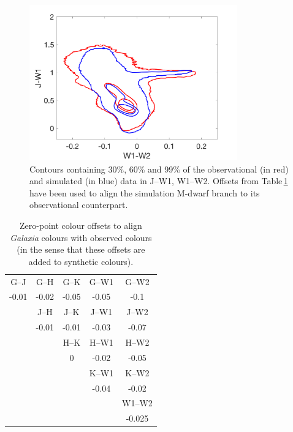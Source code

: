 \begin{figure}
	\centering
    \includegraphics[width=0.8\textwidth]{Landmarks.pdf}
    \caption{Contours containing 30\%, 60\% and 99\% of the observational (in red) and simulated (in blue) data in J--W1, W1--W2. Offsets from Table\,\ref{tabOffset} have been used to align the simulation M-dwarf branch to its observational counterpart.}
    \label{figLandmark}
\end{figure}

\begin{table}
	\begin{center}
	\begin{tabular}{c c c c c} 
 		\hline
 		 G--J & G--H & G--K & G--W1 & G--W2\\
 		-0.01 & -0.02 & -0.05  & -0.05  & -0.1\\
        \hline
            & J--H & J--K & J--W1 & J--W2\\
            & -0.01 & -0.01 & -0.03 & -0.07\\
            \cline{2-5}
            \cline{2-5}
            &    & H--K & H--W1 & H--W2\\
            &    & 0 & -0.02 & -0.05\\
            \cline{3-5}
            \cline{3-5}
            &    &    & K--W1 & K--W2\\
            &    &    & -0.04 & -0.02\\
            \cline{4-5}
            \cline{4-5}
            &    &    &     & W1--W2\\
            &    &    &     & -0.025\\
 		\cline{5-5}
	\end{tabular}
    \caption{Zero-point colour offsets to align {\em Galaxia} colours with observed colours (in the sense that these offsets are added to synthetic colours).}
    \label{tabOffset}
	\end{center}
\end{table}

